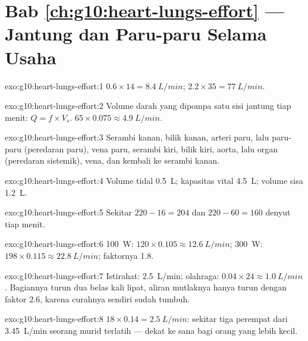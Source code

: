 \section*{Bab \ref{ch:g10:heart-lungs-effort} --- Jantung dan Paru-paru Selama Usaha}

\begin{solution}{exo:g10:heart-lungs-effort:1}
$0.6 \times 14 = \qty{8.4}{L/min}$; $2.2 \times 35 = \qty{77}{L/min}$.
\end{solution}

\begin{solution}{exo:g10:heart-lungs-effort:2}
Volume darah yang dipompa satu sisi jantung tiap menit:
$Q = f \times V_s$. $65 \times 0.075 \approx \qty{4.9}{L/min}$.
\end{solution}

\begin{solution}{exo:g10:heart-lungs-effort:3}
Serambi kanan, bilik kanan, arteri paru, lalu paru-paru (peredaran
paru), vena paru, serambi kiri, bilik kiri, aorta, lalu organ
(peredaran sistemik), vena, dan kembali ke serambi kanan.
\end{solution}

\begin{solution}{exo:g10:heart-lungs-effort:4}
Volume tidal \qty{0.5}{L}; kapasitas vital \qty{4.5}{L}; volume sisa
\qty{1.2}{L}.
\end{solution}

\begin{solution}{exo:g10:heart-lungs-effort:5}
Sekitar $220 - 16 = 204$ dan $220 - 60 = 160$ denyut tiap menit.
\end{solution}

\begin{solution}{exo:g10:heart-lungs-effort:6}
\qty{100}{W}: $120 \times 0.105 \approx \qty{12.6}{L/min}$;
\qty{300}{W}: $198 \times 0.115 \approx \qty{22.8}{L/min}$; faktornya
1.8.
\end{solution}

\begin{solution}{exo:g10:heart-lungs-effort:7}
Istirahat: \qty{2.5}{L/min}; olahraga: $0.04 \times 24 \approx
\qty{1.0}{L/min}$. Bagiannya turun dua belas kali lipat, aliran
mutlaknya hanya turun dengan faktor 2.6, karena curahnya sendiri sudah tumbuh.
\end{solution}

\begin{solution}{exo:g10:heart-lungs-effort:8}
$18 \times 0.14 = \qty{2.5}{L/min}$: sekitar tiga perempat dari
\qty{3.45}{L/min} seorang murid terlatih --- dekat ke sana bagi orang
yang lebih kecil.
\end{solution}

